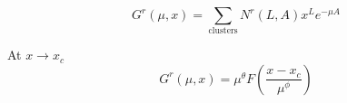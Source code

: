 \documentclass[12pt]{article}
\begin{document}
\begin{equation}
  \label{eq:1}
  G^r (\mu,x) = \sum_{\mathrm{clusters}} N^r (L,A) x^L e^{-\mu A}
\end{equation}

At $x\to x_c$
\begin{equation}
  \label{eq:6}
  G^r(\mu,x)= \mu^{\theta} F\left(\frac{x-x_c}{\mu^{\phi}}\right)
\end{equation}

\end{document}
